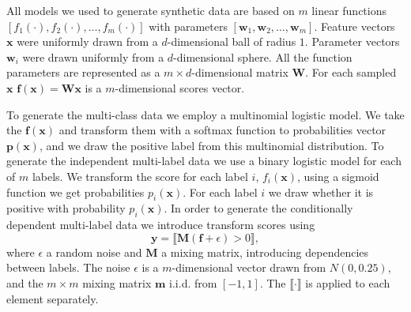 \documentclass{article}
\renewcommand{\vec}[1]{\boldsymbol{#1}}
\newcommand{\bx}{\vec{x}}
\newcommand{\by}{\vec{y}}
\newcommand{\assert}[1]{\llbracket #1 \rrbracket}
\begin{document}
{All models we used to generate synthetic data are based on $m$ linear functions $[f_1(\cdot), f_2(\cdot), \ldots, f_m(\cdot)]$ with parameters $[\boldsymbol{w}_1, \boldsymbol{w}_2, \ldots, \boldsymbol{w}_m]$. Feature vectors $\bx$ were uniformly drawn from a $d$-dimensional ball of radius $1$. Parameter vectors $\boldsymbol{w}_i$ were drawn uniformly from a $d$-dimensional sphere. All the function parameters are represented as a $m \times d$-dimensional matrix $\boldsymbol{W}$. For each sampled $\bx$ $\boldsymbol{f}(\bx) = \boldsymbol{W}\bx$  is a $m$-dimensional scores vector.

To generate the multi-class data we employ a multinomial logistic model. We take the $\boldsymbol{f}(\bx)$ and transform them with a softmax function to probabilities vector $\boldsymbol{p}(\bx)$, and we draw the positive label from this multinomial distribution.
To generate the independent multi-label data we use a binary logistic model for each of $m$ labels. We transform the score for each label $i$, $f_i(\bx)$, using a sigmoid function we get probabilities $p_i(\bx)$. For each label $i$ we draw whether it is positive with probability $p_i(\bx)$. In order to generate the conditionally dependent multi-label data we introduce transform scores using 
\begin{equation*}
\by = \assert{\boldsymbol{M} (\boldsymbol{f} +  \epsilon ) >  0  },
\end{equation*}
where $\epsilon$ a random noise and $\boldsymbol{M}$ a mixing matrix, introducing dependencies between labels. The noise $\epsilon$ is a $m$-dimensional vector drawn from $N(0, 0.25)$, and the $m \times m$ mixing matrix $\boldsymbol{m}$ i.i.d. from $[-1, 1]$. The $\assert{\cdot}$ is applied to each element separately.


}
\end{document}
